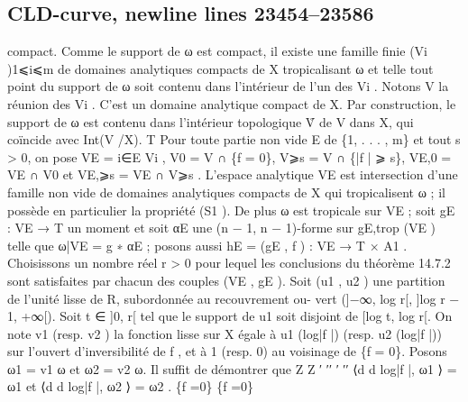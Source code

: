 \documentclass[
  10pt,
]{article}
\newenvironment{Shaded}{}{}
\newcommand{\NormalTok}[1]{#1}
\begin{document}
\subsection{CLD-curve, newline lines
23454--23586}\label{cld-curve-newline-lines-2345423586}

\begin{Shaded}
\begin{Highlighting}[]
\NormalTok{compact. Comme le support de ω est compact, il existe une famille finie (Vi )1⩽i⩽m de}
\NormalTok{domaines analytiques compacts de X tropicalisant ω et telle tout point du support de ω}
\NormalTok{soit contenu dans l’intérieur de l’un des Vi . Notons V la réunion des Vi . C’est un domaine}
\NormalTok{analytique compact de X. Par construction, le support de ω est contenu dans l’intérieur}
\NormalTok{topologique V̊ de V dans X, qui coïncide avec Int(V /X).                                 T}
\NormalTok{   Pour toute partie non vide E de \{1, . . . , m\} et tout s \textgreater{} 0, on pose VE = i∈E Vi ,}
\NormalTok{V0 = V ∩ \{f = 0\}, V⩾s = V ∩ \{|f | ⩾ s\}, VE,0 = VE ∩ V0 et VE,⩾s = VE ∩ V⩾s . L’espace}
\NormalTok{analytique VE est intersection d’une famille non vide de domaines analytiques compacts}
\NormalTok{de X qui tropicalisent ω ; il possède en particulier la propriété (S1 ). De plus ω est tropicale}
\NormalTok{sur VE ; soit gE : VE → T un moment et soit αE une (n − 1, n − 1){-}forme sur gE,trop (VE )}
\NormalTok{telle que ω|VE = g ∗ αE ; posons aussi hE = (gE , f ) : VE → T × A1 . Choisissons un nombre}
\NormalTok{réel r \textgreater{} 0 pour lequel les conclusions du théorème 14.7.2 sont satisfaites par chacun des}
\NormalTok{couples (VE , gE ).}
\NormalTok{   Soit (u1 , u2 ) une partition de l’unité lisse de R, subordonnée au recouvrement ou{-}}
\NormalTok{vert (]−∞, log r[, ]log r − 1, +∞[). Soit t ∈ ]0, r[ tel que le support de u1 soit disjoint}
\NormalTok{de [log t, log r[. On note v1 (resp. v2 ) la fonction lisse sur X égale à u1 (log|f |) (resp.}
\NormalTok{u2 (log|f |)) sur l’ouvert d’inversibilité de f , et à 1 (resp. 0) au voisinage de \{f = 0\}.}
\NormalTok{Posons ω1 = v1 ω et ω2 = v2 ω. Il suffit de démontrer que}
\NormalTok{                                     Z                                   Z}
\NormalTok{                   ′ ′′                                ′ ′′}
\NormalTok{                ⟨d d log|f |, ω1 ⟩ =          ω1 et ⟨d d log|f |, ω2 ⟩ =        ω2 .}
\NormalTok{                                     \{f =0\}                              \{f =0\}}


\end{Highlighting}
\end{Shaded}
\end{document}
